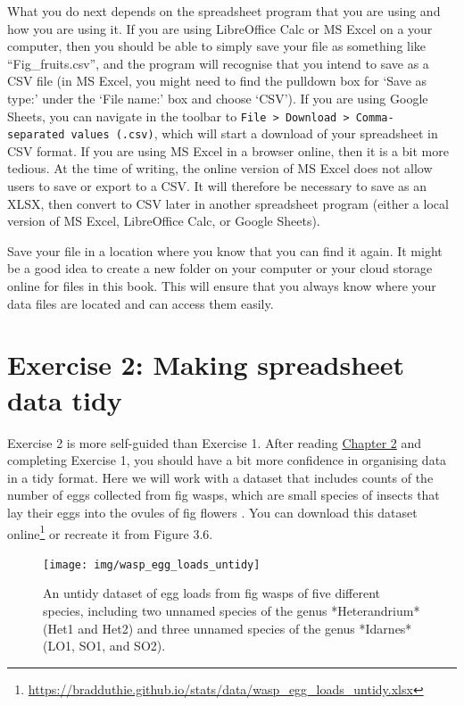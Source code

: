 \documentclass[
]{scrbook}
\begin{document}
What you do next depends on the spreadsheet program that you are using and how you are using it.
If you are using LibreOffice Calc or MS Excel on a your computer, then you should be able to simply save your file as something like ``Fig\_fruits.csv'', and the program will recognise that you intend to save as a CSV file (in MS Excel, you might need to find the pulldown box for `Save as type:' under the `File name:' box and choose `CSV').
If you are using Google Sheets, you can navigate in the toolbar to \texttt{File\ \textgreater{}\ Download\ \textgreater{}\ Comma-separated\ values\ (.csv)}, which will start a download of your spreadsheet in CSV format.
If you are using MS Excel in a browser online, then it is a bit more tedious.
At the time of writing, the online version of MS Excel does not allow users to save or export to a CSV.
It will therefore be necessary to save as an XLSX, then convert to CSV later in another spreadsheet program (either a local version of MS Excel, LibreOffice Calc, or Google Sheets).

Save your file in a location where you know that you can find it again.
It might be a good idea to create a new folder on your computer or your cloud storage online for files in this book.
This will ensure that you always know where your data files are located and can access them easily.

\hypertarget{exercise-2-making-spreadsheet-data-tidy}{%
\section{Exercise 2: Making spreadsheet data tidy}\label{exercise-2-making-spreadsheet-data-tidy}}

Exercise 2 is more self-guided than Exercise 1.
After reading \protect\hyperlink{Chapter_2}{Chapter 2} and completing Exercise 1, you should have a bit more confidence in organising data in a tidy format.
Here we will work with a dataset that includes counts of the number of eggs collected from fig wasps, which are small species of insects that lay their eggs into the ovules of fig flowers \citep{Weiblen2002}.
You can download this dataset online\footnote{\url{https://bradduthie.github.io/stats/data/wasp_egg_loads_untidy.xlsx}} or recreate it from Figure 3.6.

\begin{figure}
\texttt{[image: img/wasp\_egg\_loads\_untidy]} \caption{An untidy dataset of egg loads from fig wasps of five different species, including two unnamed species of the genus *Heterandrium* (Het1 and Het2) and three unnamed species of the genus *Idarnes* (LO1, SO1, and SO2).}\label{fig:unnamed-chunk-16}
\end{figure}
\end{document}
